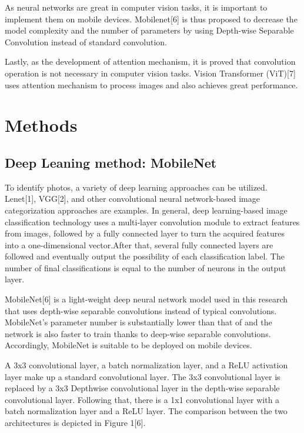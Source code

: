 \documentclass[11pt]{article}
\begin{document}
As neural networks are great in computer vision tasks, it is important
to implement them on mobile devices. Mobilenet{[}6{]} is thus proposed
to decrease the model complexity and the number of parameters by using
Depth-wise Separable Convolution instead of standard convolution.

Lastly, as the development of attention mechanism, it is proved that
convolution operation is not necessary in computer vision tasks. Vision
Transformer (ViT){[}7{]} uses attention mechanism to process images and
also achieves great performance.

    \hypertarget{methods}{%
\section{Methods}\label{methods}}

\hypertarget{deep-leaning-method-mobilenet}{%
\subsection{Deep Leaning method:
MobileNet}\label{deep-leaning-method-mobilenet}}

To identify photos, a variety of deep learning approaches can be
utilized. Lenet{[}1{]}, VGG{[}2{]}, and other convolutional neural
network-based image categorization approaches are examples. In general,
deep learning-based image classification technology uses a multi-layer
convolution module to extract features from images, followed by a fully
connected layer to turn the acquired features into a one-dimensional
vector.After that, several fully connected layers are followed and
eventually output the possibility of each classification label. The
number of final classifications is equal to the number of neurons in the
output layer.

MobileNet{[}6{]} is a light-weight deep neural network model used in
this research that uses depth-wise separable convolutions instead of
typical convolutions. MobileNet's parameter number is substantially
lower than that of and the network is also faster to train thanks to
deep-wise separable convolutions. Accordingly, MobileNet is suitable to
be deployed on mobile devices.

A 3x3 convolutional layer, a batch normalization layer, and a ReLU
activation layer make up a standard convolutional layer. The 3x3
convolutional layer is replaced by a 3x3 Depthwise convolutional layer
in the depth-wise separable convolutional layer. Following that, there
is a 1x1 convolutional layer with a batch normalization layer and a ReLU
layer. The comparison between the two architectures is depicted in
Figure 1{[}6{]}.
\end{document}
